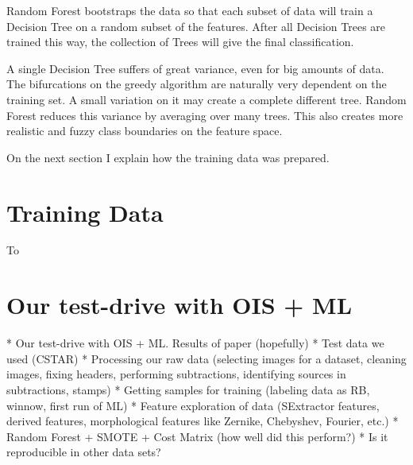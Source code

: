 Random Forest bootstraps the data so that each subset of data will train a Decision Tree on a random subset of the features. After all Decision Trees are trained this way, the collection of Trees will give the final classification.

A single Decision Tree suffers of great variance, even for big amounts of data. The bifurcations on the greedy algorithm are naturally very dependent on the training set. A small variation on it may create a complete different tree. Random Forest reduces this variance by averaging over many trees. This also creates more realistic and fuzzy class boundaries on the feature space.

On the next section I explain how the training data was prepared.

\section{Training Data}

To 


\section{Our test-drive with OIS + ML}

	* Our test-drive with OIS + ML. Results of paper (hopefully)
		* Test data we used (CSTAR)
		* Processing our raw data (selecting images for a dataset, cleaning images, fixing headers, performing subtractions, identifying sources in subtractions, stamps)
		* Getting samples for training (labeling data as RB, winnow, first run of ML)
		* Feature exploration of data (SExtractor features, derived features, morphological features like Zernike, Chebyshev, Fourier, etc.)
		* Random Forest + SMOTE + Cost Matrix (how well did this perform?)
		* Is it reproducible in other data sets?

